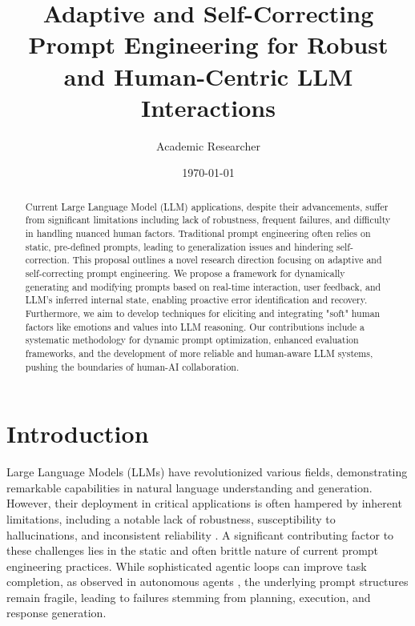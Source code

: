 \documentclass{article}
\begin{document}
\title{Adaptive and Self-Correcting Prompt Engineering for Robust and Human-Centric LLM Interactions}
\author{Academic Researcher}
\date{\today}

\maketitle

\begin{abstract}
Current Large Language Model (LLM) applications, despite their advancements, suffer from significant limitations including lack of robustness, frequent failures, and difficulty in handling nuanced human factors. Traditional prompt engineering often relies on static, pre-defined prompts, leading to generalization issues and hindering self-correction. This proposal outlines a novel research direction focusing on adaptive and self-correcting prompt engineering. We propose a framework for dynamically generating and modifying prompts based on real-time interaction, user feedback, and LLM's inferred internal state, enabling proactive error identification and recovery. Furthermore, we aim to develop techniques for eliciting and integrating "soft" human factors like emotions and values into LLM reasoning. Our contributions include a systematic methodology for dynamic prompt optimization, enhanced evaluation frameworks, and the development of more reliable and human-aware LLM systems, pushing the boundaries of human-AI collaboration.
\end{abstract}

\section{Introduction}
Large Language Models (LLMs) have revolutionized various fields, demonstrating remarkable capabilities in natural language understanding and generation. However, their deployment in critical applications is often hampered by inherent limitations, including a notable lack of robustness, susceptibility to hallucinations, and inconsistent reliability \cite{paper1_agents, paper5_legalrag}. A significant contributing factor to these challenges lies in the static and often brittle nature of current prompt engineering practices. While sophisticated agentic loops can improve task completion, as observed in autonomous agents \cite{paper1_agents}, the underlying prompt structures remain fragile, leading to failures stemming from planning, execution, and response generation.
\end{document}
